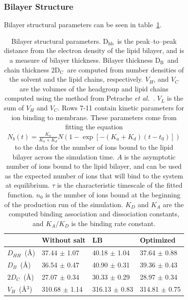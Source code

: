 \documentclass[12pt,openany,final]{book}
\newcommand{\etal}{\textit{et al.}}
\newcommand{\db}{$\text{D}_\text{B}$}
\newcommand{\dhh}{$\text{D}_\text{hh}$}
\newcommand{\dc}{$\text{2D}_\text{C}$}
\begin{document}
\subsubsection{Bilayer Structure}

Bilayer structural parameters can be seen in table~\ref{tab:struc}.
\begin{table}
    \caption[Bilayer structural parameters]{
        Bilayer structural parameters. \dhh~is the peak--to--peak distance from the electron density of the
        lipid bilayer, and is a measure of bilayer thickness. Bilayer thickness \db~and chain thickness \dc~are computed from
        number densities of the solvent and the lipid chains, respectively. $V_H$, and $V_C$ are the volumes of the headgroup and lipid chains computed
        using the method from Petrache \etal~\cite{petrache:1997}. $V_L$ is the sum of $V_H$ and $V_C$. 
        Rows 7-11 contain kinetic parameters for ion binding to membrane. These parameters come from fitting 
        the equation $ N_b(t)= \frac{K_{a}}{K_{a}+K_{d}} 
            N\left(1-\exp\left[-\left(K_{a}+K_{d}\right)\left(t-t_0\right)\right]\right)$ to the data for the number of ions
            bound to the lipid bilayer across the simulation time. 
            $A$ is the asymptotic number of ions bound to the lipid bilayer, and can be used as the expected number of ions
        that will bind to the system at equilibrium. $\tau$ is the characteristic timescale of the fitted function. $n_0$ is the number of ions bound at the beginning
        of the production run of the simulation. $K_D$ and $K_A$ are the computed binding association and dissociation constants, and $K_A/K_D$ is the binding
    rate constant.}
    \label{tab:struc}
    {\footnotesize
    \begin{tabularx}{\textwidth}{X|X|X|X}
                            & Without salt       & LB                                      & Optimized\\\hline
        $D_{HH}$~(\AA)      & 37.44 $\pm$ 1.07   & 40.18 $\pm$ 1.04                        & 37.64 $\pm$ 0.88 \\
        $D_B$~(\AA)         & 36.54 $\pm$ 0.47   & 40.90 $\pm$ 0.31                        & 39.36 $\pm$ 0.43\\
        $2D_C$~(\AA)        & 27.07 $\pm$ 0.34   & 30.33 $\pm$ 0.29                        & 28.97 $\pm$ 0.34     \\
        $V_H$~(\AA$^3$)     & 310.68 $\pm$ 1.14  & 316.13 $\pm$ 0.83                       & 314.81 $\pm$ 0.75          \\

\end{tabularx}}
\end{table}
\end{document}
